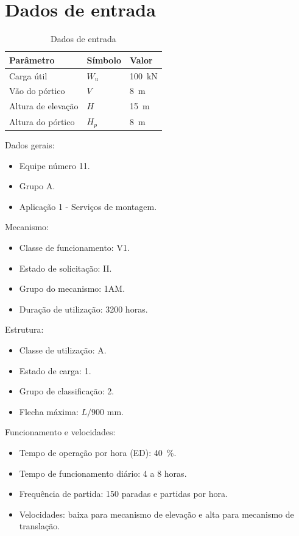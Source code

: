 \section{Dados de entrada}
\begin{table}[H]
  \centering
  \caption{Dados de entrada}
  \begin{tabularx}{\textwidth}{>{\centering\arraybackslash}X>{\centering\arraybackslash}X>{\centering\arraybackslash}X}
    \toprule
    Parâmetro          & Símbolo & Valor                  \\
    \midrule
    Carga útil         & $W_u$   & \SI{100}{\kilo\newton} \\
    Vão do pórtico     & $V$     & \SI{8}{\meter}         \\
    Altura de elevação & $H$     & \SI{15}{\meter}        \\
    Altura do pórtico  & $H_p$   & \SI{8}{\meter}         \\
    \bottomrule
  \end{tabularx}
\end{table}

Dados gerais:
\begin{itemize}[leftmargin=1.25cm]
  \item Equipe número 11.
  \item Grupo A.
  \item Aplicação 1 - Serviços de montagem.
\end{itemize}

\noindent Mecanismo:
\begin{itemize}[leftmargin=1.25cm]
  \item Classe de funcionamento: V1.
  \item Estado de solicitação: II.
  \item Grupo do mecanismo: 1AM.
  \item Duração de utilização: 3200 horas.
\end{itemize}

\noindent Estrutura:
\begin{itemize}[leftmargin=1.25cm]
  \item Classe de utilização: A.
  \item Estado de carga: 1.
  \item Grupo de classificação: 2.
  \item Flecha máxima: $L/900$ $\si{\milli\meter}$.
\end{itemize}

\noindent Funcionamento e velocidades:
\begin{itemize}[leftmargin=1.25cm]
  \item Tempo de operação por hora (ED): \SI{40}{\percent}.
  \item Tempo de funcionamento diário: 4 a 8 horas.
  \item Frequência de partida: 150 paradas e partidas por hora.
  \item Velocidades: baixa para mecanismo de elevação e alta para mecanismo de translação.
\end{itemize}